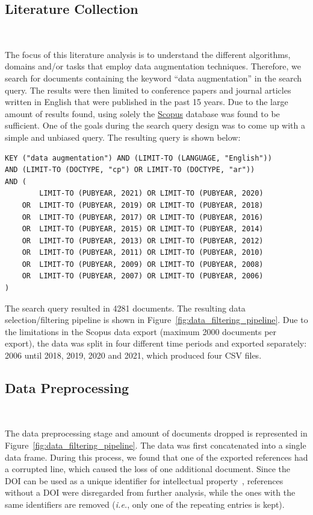 \documentclass[pdflatex,sn-mathphys]{sn-jnl}%
\theoremstyle{thmstyleone}
\theoremstyle{thmstyletwo}
\theoremstyle{thmstylethree}
\begin{document}
\subsection{Literature Collection}~\label{sec:lit_collection}

The focus of this literature analysis is to understand the different
algorithms, domains and/or tasks that employ data augmentation techniques.
Therefore, we search for documents containing the keyword ``data
augmentation'' in the search query. The results were then limited to
conference papers and journal articles written in English that were published
in the past 15 years.  Due to the large amount of results found, using solely
the \href{https://www.scopus.com/}{Scopus} database was found to be
sufficient. One of the goals during the search query design was to come up
with a simple and unbiased query. The resulting query is shown below:

\bigskip
\begin{verbatim}
KEY ("data augmentation") AND (LIMIT-TO (LANGUAGE, "English"))  
AND (LIMIT-TO (DOCTYPE, "cp") OR LIMIT-TO (DOCTYPE, "ar"))  
AND (
        LIMIT-TO (PUBYEAR, 2021) OR LIMIT-TO (PUBYEAR, 2020)  
    OR  LIMIT-TO (PUBYEAR, 2019) OR LIMIT-TO (PUBYEAR, 2018)  
    OR  LIMIT-TO (PUBYEAR, 2017) OR LIMIT-TO (PUBYEAR, 2016)  
    OR  LIMIT-TO (PUBYEAR, 2015) OR LIMIT-TO (PUBYEAR, 2014)  
    OR  LIMIT-TO (PUBYEAR, 2013) OR LIMIT-TO (PUBYEAR, 2012)  
    OR  LIMIT-TO (PUBYEAR, 2011) OR LIMIT-TO (PUBYEAR, 2010)  
    OR  LIMIT-TO (PUBYEAR, 2009) OR LIMIT-TO (PUBYEAR, 2008)  
    OR  LIMIT-TO (PUBYEAR, 2007) OR LIMIT-TO (PUBYEAR, 2006) 
)  
\end{verbatim}
\bigskip

The search query resulted in 4281 documents. The resulting data
selection/filtering pipeline is shown in
Figure~\ref{fig:data_filtering_pipeline}. Due to the limitations in the Scopus
data export (maximum 2000 documents per export), the data was split in four
different time periods and exported separately: 2006 until 2018, 2019, 2020
and 2021, which produced four CSV files.

\subsection{Data Preprocessing}~\label{sec:data_preprocessing}

The data preprocessing stage and amount of documents dropped is represented in
Figure~\ref{fig:data_filtering_pipeline}. The data was first concatenated into
a single data frame. During this process, we found that one of the exported
references had a corrupted line, which caused the loss of one additional
document.  Since the DOI can be used as a unique identifier for intellectual
property~\cite{Paskin1999}, references without a DOI were disregarded from
further analysis, while the ones with the same identifiers are removed
(\textit{i.e.}, only one of the repeating entries is kept).
\end{document}

